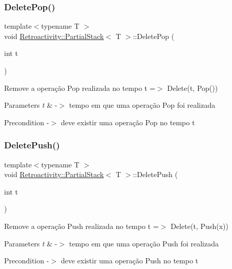 \subsubsection{\texorpdfstring{Delete\+Pop()}{DeletePop()}}
{\footnotesize\ttfamily template$<$typename T $>$ \\
void \hyperlink{classRetroactivity_1_1PartialStack}{Retroactivity\+::\+Partial\+Stack}$<$ T $>$\+::Delete\+Pop (\begin{DoxyParamCaption}\item[{int}]{t }\end{DoxyParamCaption})}

Remove a operação Pop realizada no tempo t =$>$ Delete(t, Pop())


\begin{DoxyParams}{Parameters}
{\em t} & -\/$>$ tempo em que uma operação Pop foi realizada \\
\hline
\end{DoxyParams}
\begin{DoxyPrecond}{Precondition}
-\/$>$ deve existir uma operação Pop no tempo t 
\end{DoxyPrecond}
\mbox{\label{classRetroactivity_1_1PartialStack_a91760ea459d619b817f5d819a8afac83}} 
\subsubsection{\texorpdfstring{Delete\+Push()}{DeletePush()}}
{\footnotesize\ttfamily template$<$typename T $>$ \\
void \hyperlink{classRetroactivity_1_1PartialStack}{Retroactivity\+::\+Partial\+Stack}$<$ T $>$\+::Delete\+Push (\begin{DoxyParamCaption}\item[{int}]{t }\end{DoxyParamCaption})}

Remove a operação Push realizada no tempo t =$>$ Delete(t, Push(x))


\begin{DoxyParams}{Parameters}
{\em t} & -\/$>$ tempo em que uma operação Push foi realizada \\
\hline
\end{DoxyParams}
\begin{DoxyPrecond}{Precondition}
-\/$>$ deve existir uma operação Push no tempo t 
\end{DoxyPrecond}
\mbox{\label{classRetroactivity_1_1PartialStack_a770d2d1ebb3e72296caeef6876f37a54}} 
